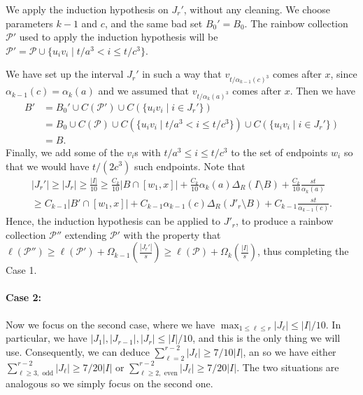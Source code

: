 \documentclass[a4paper,11pt]{article}
\makeatletter
\renewenvironment{proof}[1][\proofname] {\par\pushQED{\qed}\normalfont\topsep6\p@\@plus6\p@\relax\trivlist\item[\hskip\labelsep\bfseries#1\@addpunct{.}]\ignorespaces}{\popQED\endtrivlist\@endpefalse}
\theoremstyle{definition}
\def\cP{\mathcal{P}}
\makeatother
\begin{document}
\begin{proof}
We apply the induction hypothesis on $J_r'$, without any cleaning. We choose parameters $k-1$ and $c$, and the same bad set $B_0'=B_0$. The rainbow collection $\cP'$ used to apply the induction hypothesis will be $\cP'=\cP\cup \{u_iv_i\mid t/a^3<i\leq t/c^3\}$.

We have set up the interval $J_r'$ in such a way that $v_{t/\alpha_{k-1}(c)^3}$ comes after $x$, since $\alpha_{k-1}(c)=\alpha_k(a)$ and we assumed that $v_{t/\alpha_k(a)^3}$ comes after $x$. Then we have 
\begin{align*}
B'&=B_0'\cup C(\cP')\cup C(\{u_iv_i\mid i\in J_r'\})\\
&=B_0\cup C(\cP)\cup C(\{u_iv_i\mid t/a^3<i\leq t/c^3\})\cup C(\{u_iv_i\mid i\in J_r'\})\\
&=B.
\end{align*}
Finally, we add some of the $v_i$s with $t/a^3 \leq i\leq t/c^3$ to the set of endpoints $w_i$ so that we would have $t/(2c^3)$ such endpoints. Note that
\begin{multline*}
|J_r'|\geq |J_r|\geq \frac{|I|}{10}\geq \frac{C_k}{10}|B\cap [w_1, x]| + \frac{C_k}{10} \alpha_k(a)\Delta_R(I\setminus B)+\frac{C_k}{10} \frac{st}{\alpha_k(a)}\\
\geq C_{k-1}|B'\cap [w_1, x]| + C_{k-1} \alpha_{k-1}(c)\Delta_R(J'_r\setminus B)+C_{k-1} \frac{st}{\alpha_{k-1}(c)}.
\end{multline*}
Hence, the induction hypothesis can be applied to $J'_r$, to produce a rainbow collection $\cP''$ extending $\cP'$ with the property that $\ell(\cP'')\geq \ell(\cP')+\Omega_{k-1}(\frac{|J_r'|}{s})\geq \ell(\cP)+\Omega_k(\frac{|I|}{s})$, thus completing the Case 1.


\paragraph{Case 2:} Now we focus on the second case, where we have $\max_{1\leq \ell\leq r}|J_\ell|\leq |I|/10$. In particular, we have $|J_1|, |J_{r-1}|, |J_r|\leq |I|/10$, and this is the only thing we will use. Consequently, we can deduce $\sum_{\ell= 2}^{r-2} |J_\ell|\geq 7/10 |I|$, an so we have either $\sum_{\ell\geq 3, \text{ odd}}^{r-2}|J_\ell|\geq 7/20|I|$ or $\sum_{\ell\geq 2, \text{ even}}^{r-2}|J_\ell|\geq 7/20|I|$. The two situations are analogous so we simply focus on the second one.


\end{proof}
\end{document}
